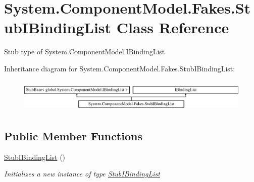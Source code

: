 \hypertarget{class_system_1_1_component_model_1_1_fakes_1_1_stub_i_binding_list}{\section{System.\-Component\-Model.\-Fakes.\-Stub\-I\-Binding\-List Class Reference}
\label{class_system_1_1_component_model_1_1_fakes_1_1_stub_i_binding_list}
}


Stub type of System.\-Component\-Model.\-I\-Binding\-List 


Inheritance diagram for System.\-Component\-Model.\-Fakes.\-Stub\-I\-Binding\-List\-:\begin{figure}[H]
\begin{center}
\leavevmode
\includegraphics[height=1.623188cm]{class_system_1_1_component_model_1_1_fakes_1_1_stub_i_binding_list}
\end{center}
\end{figure}
\subsection*{Public Member Functions}
\begin{DoxyCompactItemize}
\item 
\hyperlink{class_system_1_1_component_model_1_1_fakes_1_1_stub_i_binding_list_ac02e5ade2d2b07300acad92e181c7c73}{Stub\-I\-Binding\-List} ()
\begin{DoxyCompactList}\small\item\em Initializes a new instance of type \hyperlink{class_system_1_1_component_model_1_1_fakes_1_1_stub_i_binding_list}{Stub\-I\-Binding\-List}\end{DoxyCompactList}\end{DoxyCompactItemize}
